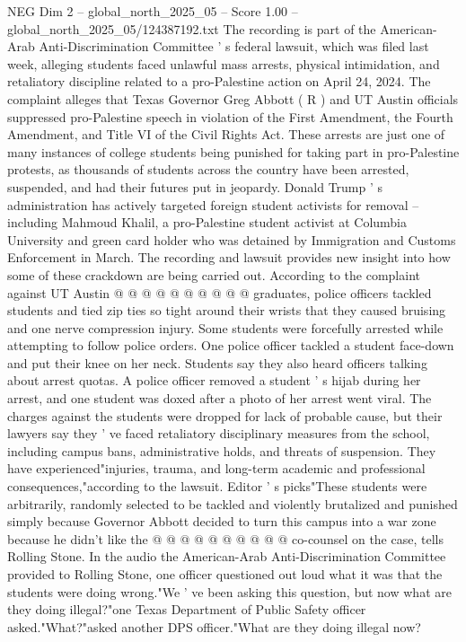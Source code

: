 \begin{textsample}{NEG Dim 2 – global\_north\_2025\_05 – Score 1.00 – global\_north\_2025\_05/124387192.txt}  \label{ex:f2_neg_236}
The recording is part of the American-Arab Anti-Discrimination Committee ' s federal lawsuit, which was filed last week, alleging students faced unlawful mass arrests, physical intimidation, and retaliatory discipline related to a pro-Palestine action on April 24, 2024.
The complaint alleges that Texas Governor Greg Abbott ( R ) and UT Austin officials suppressed pro-Palestine speech in violation of the First Amendment, the Fourth Amendment, and Title VI of the Civil Rights Act.
These arrests are just one of many instances of college students being punished for taking part in pro-Palestine protests, as thousands of students across the country have been arrested, suspended, and had their futures put in jeopardy.
Donald Trump ' s administration has actively targeted foreign student activists for removal -- including Mahmoud Khalil, a pro-Palestine student activist at Columbia University and green card holder who was detained by Immigration and Customs Enforcement in March.
The recording and lawsuit provides new insight into how some of these crackdown are being carried out.
According to the complaint against UT Austin @ @ @ @ @ @ @ @ @ @ graduates, police officers tackled students and tied zip ties so tight around their wrists that they caused bruising and one nerve compression injury.
Some students were forcefully arrested while attempting to follow police orders.
One police officer tackled a student face-down and put their knee on her neck.
Students say they also heard officers talking about arrest quotas.
A police officer removed a student ' s hijab during her arrest, and one student was doxed after a photo of her arrest went viral.
The charges against the students were dropped for lack of probable cause, but their lawyers say they ' ve faced retaliatory disciplinary measures from the school, including campus bans, administrative holds, and threats of suspension.
They have experienced"injuries, trauma, and long-term academic and professional consequences,"according to the lawsuit.
Editor ' s picks"These students were arbitrarily, randomly selected to be tackled and violently brutalized and punished simply because Governor Abbott decided to turn this campus into a war zone because he didn't like the @ @ @ @ @ @ @ @ @ @ co-counsel on the case, tells Rolling Stone.
In the audio the American-Arab Anti-Discrimination Committee provided to Rolling Stone, one officer questioned out loud what it was that the students were doing wrong."We ' ve been asking this question, but now what are they doing illegal?"one Texas Department of Public Safety officer asked."What?"asked another DPS officer."What are they doing illegal now?

\end{textsample}
